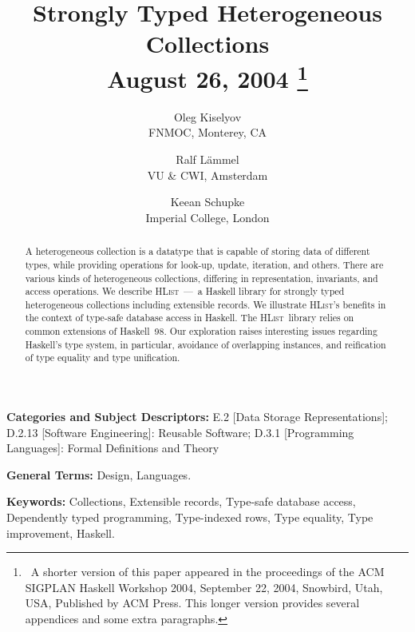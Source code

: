 \documentclass[nocopyrightspace,preprint]{sigplan-proc}
\newcommand{\hwVsTr}[2]{#2}
\newcommand{\HList}{\textsc{HList}}
\begin{document}
\title{Strongly Typed Heterogeneous Collections\\
\hwVsTr{}{{\large August 26, 2004}%
\thanks{%
%
\ A shorter version of this paper appeared in the proceedings of
the ACM SIGPLAN Haskell Workshop 2004, September 22, 2004, Snowbird,
Utah, USA, Published by ACM Press. This longer version provides
several appendices and some extra paragraphs.}}}

\author{Oleg Kiselyov\\FNMOC, Monterey, CA
\and
Ralf L{\"a}mmel\\VU \& CWI, Amsterdam
\and
Keean Schupke\\Imperial College, London}

\maketitle

\begin{abstract}

A heterogeneous collection is a datatype that is capable of storing
data of different types, while providing operations for look-up,
update, iteration, and others. There are various kinds of
heterogeneous collections, differing in representation, invariants,
and access operations. We describe \HList~---~a Haskell library for
strongly typed heterogeneous collections including extensible records.
We illustrate \HList's benefits in the context of type-safe database
access in Haskell. The \HList\ library relies on common extensions of
Haskell~98. Our exploration raises interesting issues regarding
Haskell's type system, in particular, avoidance of overlapping
instances, and reification of type equality and type unification.

\end{abstract}


\vspace{1mm}
\noindent
{\bf Categories and Subject Descriptors:}
E.2 {[Data Storage Representations]};
D.2.13 {[Software Engineering]}: {Reusable Software};
D.3.1 {[Programming Languages]}: {Formal Definitions and Theory}
 
 
\vspace{1mm}
\noindent
{\bf General Terms:} Design, Languages.

\vspace{1mm}
\noindent
{\bf Keywords:} Collections, Extensible records, Type-safe database
access, Dependently typed programming, Type-indexed rows, Type equality,
Type improvement, Haskell.
\end{document}
